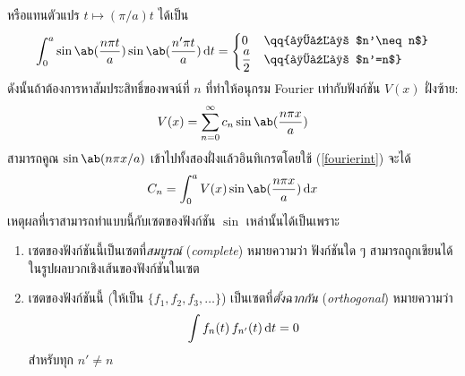 หรือแทนตัวแปร $t\mapsto(\pi/a)t$ ได้เป็น
\begin{equation}
    \int_0^a\sin\ab(\frac{n\pi t}{a})\sin\ab(\frac{n'\pi t}{a})\odif{t}=\begin{cases}
        0&\qq{ถ้า $n'\neq n$}\\
        \dfrac{a}{2}&\qq{ถ้า $n'=n$}
    \end{cases}\label{fourierint}
\end{equation}
ดังนั้นถ้าต้องการหาสัมประสิทธิ์ของพจน์ที่ $n$ ที่ทำให้อนุกรม Fourier เท่ากับฟังก์ชัน $V(x)$ ฝั่งซ้าย:
\[
V(x)=\sum_{n=0}^\infty c_n\sin\ab(\frac{n\pi x}{a})
\]
สามารถคูณ $\sin\ab(n\pi x/a)$ เข้าไปทั้งสองฝั่งแล้วอินทิเกรตโดยใช้ (\ref{fourierint}) จะได้
\begin{equation}
    C_n=\int_0^a V(x)\sin\ab(\frac{n\pi x}{a})\odif{x}
\end{equation}
เหตุผลที่เราสามารถทำแบบนี้กับเซตของฟังก์ชัน $\sin$ เหล่านั้นได้เป็นเพราะ
\begin{enumerate}
    \item เซตของฟังก์ชันนี้เป็นเซตที่\emph{สมบูรณ์} (\emph{complete}) หมายความว่า ฟังก์ชันใด ๆ สามารถถูกเขียนได้ในรูปผลบวกเชิงเส้นของฟังก์ชันในเซต
    \item เซตของฟังก์ชันนี้ (ให้เป็น $\{f_1,f_2,f_3,\dots\}$) เป็นเซตที่\emph{ตั้งฉากกัน} (\emph{orthogonal}) หมายความว่า
    \[
    \int f_n(t)\,f_{n'}(t)\odif{t}=0
    \]
    สำหรับทุก $n'\neq n$
\end{enumerate}
